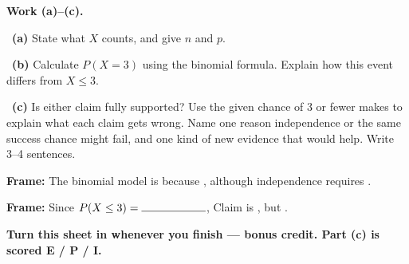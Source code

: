 \documentclass[11pt]{article}
\begin{document}
\newpage
\textbf{Work (a)--(c).}\par\smallskip

~\textbf{(a)} State what $X$ counts, and give $n$ and $p$.\par
\workspace{0.8in}

~\textbf{(b)} Calculate $P(X=3)$ using the binomial formula. Explain how this event differs from $X\leq3$.\par
\workspace{1.3in}

~\textbf{(c)} Is either claim fully supported? Use the given chance of 3 or fewer makes to explain what each claim gets wrong. Name one reason independence or the same success chance might fail, and one kind of new evidence that would help. Write 3--4 sentences.\par
\workspace{2.0in}

\begin{sentenceframebox}\raggedright\textbf{Frame:} The binomial model is \blank[1in] because \blank[2.5in], although independence requires \blank[1.8in].\end{sentenceframebox}

\begin{sentenceframebox}\raggedright\textbf{Frame:} Since $P(X\leq3)=\blank[0.8in]$, Claim \blank[0.4in] is \blank[0.9in], but \blank[2.2in].\end{sentenceframebox}

\textbf{Turn this sheet in whenever you finish --- bonus credit. Part (c) is scored E / P / I.}\par
\end{document}
